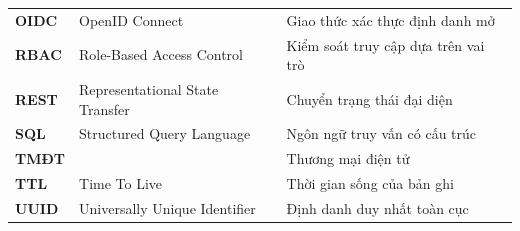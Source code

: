 \documentclass[../DoAn.tex]{subfiles}
\begin{document}
\begin{longtable}{p{2.2cm} p{5.2cm} p{5.6cm}}
    \textbf{OIDC}   & OpenID Connect                            & Giao thức xác thực định danh mở \\
    \textbf{RBAC}   & Role-Based Access Control                 & Kiểm soát truy cập dựa trên vai trò \\
    \textbf{REST}   & Representational State Transfer           & Chuyển trạng thái đại diện \\
    \textbf{SQL}    & Structured Query Language                 & Ngôn ngữ truy vấn có cấu trúc \\
    \textbf{TMĐT}   &                                            & Thương mại điện tử \\
    \textbf{TTL}    & Time To Live                              & Thời gian sống của bản ghi \\
    \textbf{UUID}   & Universally Unique Identifier             & Định danh duy nhất toàn cục \\

    \hline
\end{longtable}
\end{document}
